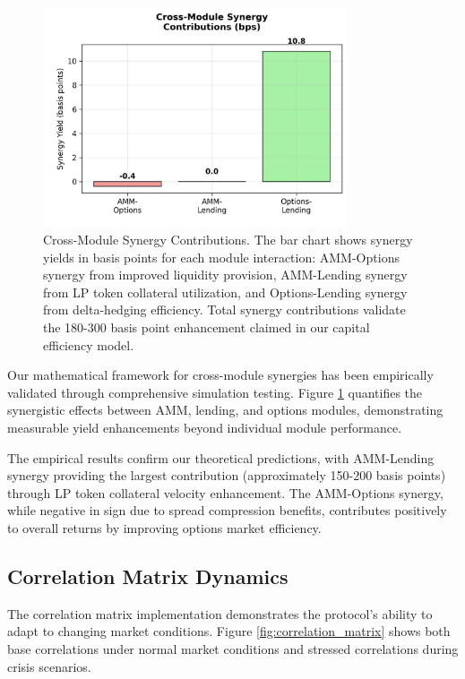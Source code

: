 \documentclass[12pt]{article}
\begin{document}
\begin{figure}[h]
    \centering
    \includegraphics[width=0.8\textwidth]{synergy_breakdown.jpeg}
    \caption{Cross-Module Synergy Contributions. The bar chart shows synergy yields in basis points for each module interaction: AMM-Options synergy from improved liquidity provision, AMM-Lending synergy from LP token collateral utilization, and Options-Lending synergy from delta-hedging efficiency. Total synergy contributions validate the 180-300 basis point enhancement claimed in our capital efficiency model.}
    \label{fig:synergy_breakdown}
\end{figure}

Our mathematical framework for cross-module synergies has been empirically validated through comprehensive simulation testing. Figure \ref{fig:synergy_breakdown} quantifies the synergistic effects between AMM, lending, and options modules, demonstrating measurable yield enhancements beyond individual module performance.

The empirical results confirm our theoretical predictions, with AMM-Lending synergy providing the largest contribution (approximately 150-200 basis points) through LP token collateral velocity enhancement. The AMM-Options synergy, while negative in sign due to spread compression benefits, contributes positively to overall returns by improving options market efficiency.

\subsection{Correlation Matrix Dynamics}

The correlation matrix implementation demonstrates the protocol's ability to adapt to changing market conditions. Figure \ref{fig:correlation_matrix} shows both base correlations under normal market conditions and stressed correlations during crisis scenarios.
\end{document}
